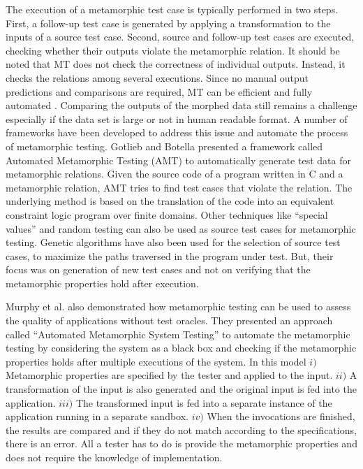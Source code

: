 The execution of a metamorphic test case is typically performed in two steps. First, a follow-up test case is generated by applying a transformation to the inputs of a source test case. Second, source and follow-up test cases are executed, checking whether their outputs violate the metamorphic relation. It should be noted that MT does not check the correctness of individual outputs. Instead, it checks the relations among several executions. Since no manual output predictions and comparisons are required, MT can be efficient and fully automated \cite{Segura2016}. Comparing the outputs of the morphed data still remains a challenge especially if the data set is large or not in human readable format.
A number of frameworks have been developed to address this issue and automate the process of metamorphic testing. Gotlieb and Botella \cite{Gotlieb2003} presented a framework called Automated Metamorphic Testing (AMT) to automatically generate test data for metamorphic relations. Given the source code of a program written in C and a metamorphic relation, AMT tries to find test cases that violate the relation. The underlying method is based on the translation of the code into an equivalent constraint logic program over finite domains. Other techniques like “special values” and random testing can also be used as source test cases for metamorphic testing. Genetic algorithms have also been used for the selection of source test cases, to maximize the paths traversed in the program under test. But, their focus was on generation of new test cases and not on verifying that the metamorphic properties hold after execution.
	
Murphy et al. \cite{Murphy2009} also demonstrated how metamorphic testing can be used to assess the quality of applications without test oracles.  They presented an approach called ``Automated Metamorphic System Testing'' to automate the metamorphic testing by considering the system as a black box and checking if the metamorphic properties holds after multiple executions of the system. In this model $i)$ Metamorphic properties are specified by the tester and applied to the input. $ii)$ A transformation of the input is also generated and the original input is fed into the application. $iii)$ The transformed input is fed into a separate instance of the application running in a separate sandbox. $iv)$ When the invocations are finished, the results are compared and if they do not match according to the specifications, there is an error. All a tester has to do is provide the metamorphic properties and does not require the knowledge of implementation.

